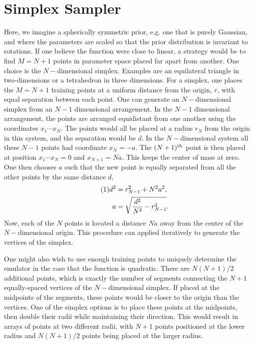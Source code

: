 \documentclass[12pt]{article}
\numberwithin{equation}{section}
\numberwithin{figure}{section}
\newcommand\eqnumber{\addtocounter{equation}{1}\tag{\theequation}}
\begin{document}
\section{Simplex Sampler}\label{sec:simplex}

Here, we imagine a spherically symmetric prior, e.g. one that is purely Gaussian, and where the parameters are scaled so that the prior distribution is invariant to rotations. If one believe the function were close to linear, a strategy would be to find $M=N+1$ points in parameter space placed far apart from another. One choice is the $N-$dimensional simplex. Examples are an equilateral triangle in two-dimensions or a tetrahedron in three dimensions. For a simplex, one places the $M=N+1$ training points at a uniform distance from the origin, $r$, with equal separation between each point. One can generate an $N-$dimensional simplex from an $N-1$ dimensional arrangement. In the $N-1$ dimensional arrangement, the points are arranged equidistant from one another using the coordinates $x_1\cdots x_{N}$. The points would all be placed at a radius $r_{N}$ from the origin in this system, and the separation would be $d$. In the $N-$dimensional system all these $N-1$ points had coordinate $x_N=-a$. The $(N+1)^{\rm th}$ point is then placed at position $x_1\cdots x_{N}=0$ and $x_{N+1}=Na$. This keeps the center of mass at zero. One then chooses $a$ such that the new point is equally separated from all the other points by the same distance $d$, 
\begin{align*}\eqnumber
d^2&=r_{N-1}^2+N^2a^2,\\
a&=\sqrt{\frac{d^2}{N^2}-r_{N-1}^2}.
\end{align*}
Now, each of the $N$ points is located a distance $Na$ away from the center of the $N-$dimensional origin. This procedure can applied iteratively to generate the vertices of the simplex.

One might also wish to use enough training points to uniquely determine the emulator in the case that the function is quadratic. There are $N(N+1)/2$ additional points, which is exactly the number of segments connecting the $N+1$ equally-spaced vertices of the  $N-$dimensional simplex. If placed at the midpoints of the segments, these points would be closer to the  origin than the vertices. One of the simplex options is to place these points at the midpoints, then double their radii while maintaining their direction. This would result in arrays of points at two different radii, with $N+1$ points positioned at the lower radius and $N(N+1)/2$ points being placed at the larger radius.
\end{document}
